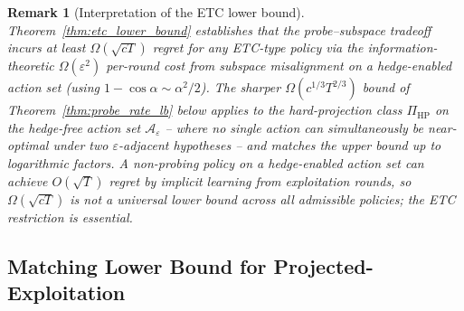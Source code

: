 \documentclass[11pt]{article}
\newcommand{\cA}{\mathcal{A}}
\newtheorem{remark}{Remark}
\begin{document}
\begin{remark}[Interpretation of the ETC lower bound]
\label{rem:etc_lb_interpretation}
Theorem~\ref{thm:etc_lower_bound} establishes that the probe--subspace
tradeoff incurs at least $\Omega(\sqrt{cT})$ regret for any ETC-type
policy via the information-theoretic $\Omega(\varepsilon^2)$ per-round
cost from subspace misalignment on a hedge-enabled action set (using
$1-\cos\alpha\sim\alpha^2/2$).
The sharper $\Omega(c^{1/3}T^{2/3})$ bound of
Theorem~\ref{thm:probe_rate_lb} below applies to the hard-projection class
$\Pi_{\mathrm{HP}}$ on the hedge-free action set $\cA_\varepsilon$ --
where no single action can simultaneously be near-optimal under two
$\varepsilon$-adjacent hypotheses -- and matches the upper bound up to
logarithmic factors.
A non-probing policy on a hedge-enabled action set can achieve
$O(\sqrt T)$ regret by implicit learning from exploitation rounds, so
$\Omega(\sqrt{cT})$ is not a universal lower bound across all admissible
policies; the ETC restriction is essential.
\end{remark}

\subsection{Matching Lower Bound for Projected-Exploitation}
\label{sec:matching_lb}
\end{document}
